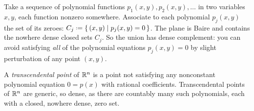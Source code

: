 \begin{example}
Take a sequence of polynomial functions \(p_1(x,y), p_2(x,y), \dots\) in two variables \(x,y\), each function nonzero somewhere.
Associate to each polynomial \(p_j(x,y)\) the set of its zeroes: \(C_j\defeq\set{(x,y)|p_j(x,y)=0}\).
The plane is Baire and contains the nowhere dense closed sets \(C_j\).
So the union has dense complement: you can avoid satisfying \emph{all} of the polynomial equations \(p_j(x,y)=0\) by slight perturbation of any point \((x,y)\).
\end{example}
\begin{example}
A \emph{transcendental point} of \(\mathbb{R}^{n}\) is a point not satisfying any nonconstant polynomial equation \(0=p(x)\) with rational coefficients.
Transcendental points of \(\mathbb{R}^{n}\) are generic, so dense, as there are countably many such polynomials, each with a closed, nowhere dense, zero set.
\end{example}

